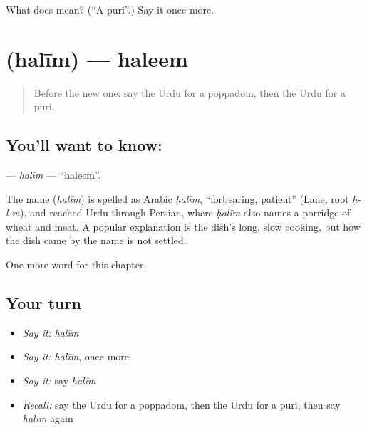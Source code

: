 \begin{tcolorbox}[breakable,colback=teal!4,colframe=teal!35!black,title={Before you move on}]
What does  mean? (\textquotedblleft{}A puri\textquotedblright{}.) Say it once more.
\end{tcolorbox}
\section[\texorpdfstring{\ur{حلیم} (halīm)}{حلیم (halīm)}]{ (halīm) — haleem}

\label{lesson:UR-C234-halim}



\begin{quote}
Before the new one: say the Urdu for a poppadom, then the Urdu for a puri.
\end{quote}

\subsection*{You'll want to know: }
\textbf{} — \emph{halīm} — \textquotedblleft{}haleem\textquotedblright{}.

\begin{cousinweb}
The name \textbf{} (\emph{halīm}) is spelled as Arabic \emph{ḥalīm}, \textquotedblleft{}forbearing, patient\textquotedblright{} (Lane, root \emph{ḥ-l-m}), and reached Urdu through Persian, where \emph{ḥalīm} also names a porridge of wheat and meat. A popular explanation is the dish's long, slow cooking, but how the dish came by the name is not settled.
\end{cousinweb}

\begin{grammarlens}[title={What you've built}]
One more word for this chapter.
\end{grammarlens}

\subsection*{Your turn}
\begin{itemize}
\raggedright
  \item \emph{Say it:} \emph{halīm}
  \item \emph{Say it:} \emph{halīm}, once more
  \item \emph{Say it:} say \emph{halīm}
  \item \emph{Recall:} say the Urdu for a poppadom, then the Urdu for a puri, then say \emph{halīm} again
\end{itemize}

